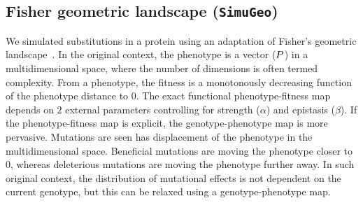 \begin{table}[H]
    \centering
    \noindent{}
    \caption[Inferred amino-acid entropy for \texttt{SimuPoly}]{
    Estimated amino-acid entropy under simulation accounting for finite population effects, site linkage and short term fluctuation of $\Ne$.
    Estimation is obtained with the mechanistic inference model developed in this paper of site-specific amino-acid fitness profiles and log-Brownian process for $\Ne$, $\mu$ and life-history traits (in the left column), or under the assumption of constant $\Ne$ (in the right column).}
\end{table}

\subsection{Fisher geometric landscape (\texttt{SimuGeo})}
\label{subsec:fisher-geometric-landscape}

We simulated substitutions in a protein using an adaptation of Fisher's geometric landscape~\citep{Tenaillon2014,Blanquart2016}.
In the original context, the phenotype is a vector ($P$) in a multidimensional space, where the number of dimensions is often termed complexity.
From a phenotype, the fitness is a monotonously decreasing function of the phenotype distance to $0$.
The exact functional phenotype-fitness map depends on $2$ external parameters controlling for strength ($\alpha$) and epistasis ($\beta$).
If the phenotype-fitness map is explicit, the genotype-phenotype map is more pervasive.
Mutations are seen has displacement of the phenotype in the multidimensional space.
Beneficial mutations are moving the phenotype closer to $0$, whereas deleterious mutations are moving the phenotype further away.
In such original context, the distribution of mutational effects is not dependent on the current genotype, but this can be relaxed using a genotype-phenotype map.\\

